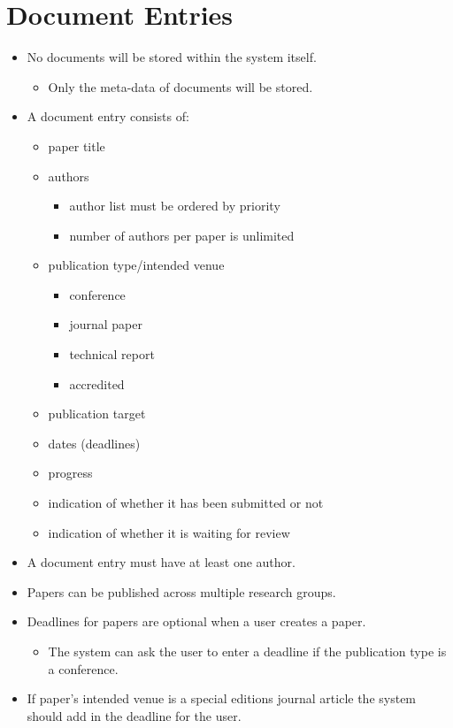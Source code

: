 \documentclass{article}
\begin{document}
\section{Document Entries}\label{sec:docs}
	\begin{itemize}
		\item No documents will be stored within the system itself.
		\begin{itemize}
			\item Only the meta-data of documents will be stored.
		\end{itemize}
		\item A document entry consists of:
		\begin{itemize}
			\item paper title
			\item authors
			\begin{itemize}
				\item author list must be ordered by priority
				\item number of authors per paper is unlimited
			\end{itemize}
			\item publication type/intended venue
			\begin{itemize}
				\item conference
				\item journal paper
				\item technical report
				\item accredited
			\end{itemize}
			\item publication target
			\item dates (deadlines)
			\item progress
			\item indication of whether it has been submitted or not
			\item indication of whether it is waiting for review
		\end{itemize}
		\item A document entry must have at least one author.
		\item Papers can be published across multiple research groups.
		\item Deadlines for papers are optional when a user creates a paper.
			\begin{itemize}
				\item The system can ask the user to enter a deadline if the publication type is a conference.
			\end{itemize}
		\item If paper's intended venue is a special editions journal article the system should add in the deadline for the user.

\end{itemize}
\end{document}
